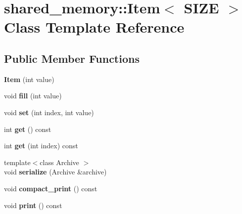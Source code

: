 \hypertarget{classshared__memory_1_1Item}{}\section{shared\+\_\+memory\+:\+:Item$<$ S\+I\+ZE $>$ Class Template Reference}
\label{classshared__memory_1_1Item}
\subsection*{Public Member Functions}
\begin{DoxyCompactItemize}
\item 
{\bfseries Item} (int value)\hypertarget{classshared__memory_1_1Item_a6d7d4864fe09b43ec99356e9c0c62b98}{}\label{classshared__memory_1_1Item_a6d7d4864fe09b43ec99356e9c0c62b98}

\item 
void {\bfseries fill} (int value)\hypertarget{classshared__memory_1_1Item_a765ce924f63067b2df32f4170175611e}{}\label{classshared__memory_1_1Item_a765ce924f63067b2df32f4170175611e}

\item 
void {\bfseries set} (int index, int value)\hypertarget{classshared__memory_1_1Item_a7941efea49faeb757864ae273604fd22}{}\label{classshared__memory_1_1Item_a7941efea49faeb757864ae273604fd22}

\item 
int {\bfseries get} () const \hypertarget{classshared__memory_1_1Item_ac4d6b35bef7d7ddeee7102cd9a245e50}{}\label{classshared__memory_1_1Item_ac4d6b35bef7d7ddeee7102cd9a245e50}

\item 
int {\bfseries get} (int index) const \hypertarget{classshared__memory_1_1Item_abbad388adf21cfb53b84916d10eda23f}{}\label{classshared__memory_1_1Item_abbad388adf21cfb53b84916d10eda23f}

\item 
{\footnotesize template$<$class Archive $>$ }\\void {\bfseries serialize} (Archive \&archive)\hypertarget{classshared__memory_1_1Item_ab48965377a911cf7b625926759b4e0f9}{}\label{classshared__memory_1_1Item_ab48965377a911cf7b625926759b4e0f9}

\item 
void {\bfseries compact\+\_\+print} () const \hypertarget{classshared__memory_1_1Item_ad3ca702e477914370c16f19a77d799b5}{}\label{classshared__memory_1_1Item_ad3ca702e477914370c16f19a77d799b5}

\item 
void {\bfseries print} () const \hypertarget{classshared__memory_1_1Item_a3ff278246a9cb6a7c14f0b0b9370f2a7}{}\label{classshared__memory_1_1Item_a3ff278246a9cb6a7c14f0b0b9370f2a7}

\end{DoxyCompactItemize}
